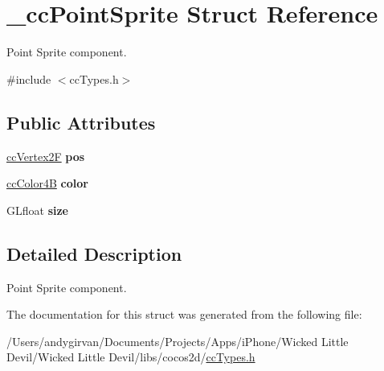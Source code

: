 \hypertarget{struct__cc_point_sprite}{\section{\-\_\-cc\-Point\-Sprite Struct Reference}
\label{struct__cc_point_sprite}
}


Point Sprite component.  




{\ttfamily \#include $<$cc\-Types.\-h$>$}

\subsection*{Public Attributes}
\begin{DoxyCompactItemize}
\item 
\hypertarget{struct__cc_point_sprite_ab9897fa2d8fbb855df344e84cadf17a5}{\hyperlink{cc_types_8h_a3d0a9a02a1f9787a9ede91b9a74bf41f}{cc\-Vertex2\-F} {\bfseries pos}}\label{struct__cc_point_sprite_ab9897fa2d8fbb855df344e84cadf17a5}

\item 
\hypertarget{struct__cc_point_sprite_a634cf0c9e0dd931152d463397de1b08d}{\hyperlink{cc_types_8h_a2f83e39e0378b79d089014c140169793}{cc\-Color4\-B} {\bfseries color}}\label{struct__cc_point_sprite_a634cf0c9e0dd931152d463397de1b08d}

\item 
\hypertarget{struct__cc_point_sprite_aa339a2a7ddbfacde8deb0e0ffd719f30}{G\-Lfloat {\bfseries size}}\label{struct__cc_point_sprite_aa339a2a7ddbfacde8deb0e0ffd719f30}

\end{DoxyCompactItemize}


\subsection{Detailed Description}
Point Sprite component. 

The documentation for this struct was generated from the following file\-:\begin{DoxyCompactItemize}
\item 
/\-Users/andygirvan/\-Documents/\-Projects/\-Apps/i\-Phone/\-Wicked Little Devil/\-Wicked Little Devil/libs/cocos2d/\hyperlink{cc_types_8h}{cc\-Types.\-h}\end{DoxyCompactItemize}
